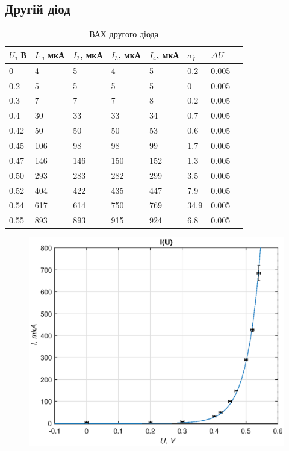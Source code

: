 \documentclass[12pt]{article}
\begin{document}
\subsection{Другій діод}
\begin{table}[ht]
	\centering
	\caption{ВАХ другого діода}
	\begin{tabular}{llllllll}
		\hline
        $U$, В & $I_1$, мкА & $I_2$, мкА & $I_3$, мкА & $I_4$, мкА & $\sigma_{\overline{I}}$ &  $\Delta U$\\
		\hline
		0    & 4   & 5   & 4     & 5   & 0.2  & 0.005\\
        0.2  & 5   & 5   & 5     & 5   & 0    & 0.005\\
        0.3  & 7   & 7   & 7     & 8   & 0.2  & 0.005\\
        0.4  & 30  & 33  & 33    & 34  & 0.7  & 0.005\\
        0.42 & 50  & 50  & 50    & 53  & 0.6  & 0.005\\
        0.45 & 106 & 98  & 98    & 99  & 1.7  & 0.005\\
        0.47 & 146 & 146 & 150   & 152 & 1.3  & 0.005\\
        0.50 & 293 & 283 & 282   & 299 & 3.5  & 0.005\\
        0.52 & 404 & 422 & 435   & 447 & 7.9  & 0.005\\
        0.54 & 617 & 614 & 750   & 769 & 34.9 & 0.005\\
        0.55 & 893 & 893 & 915   & 924 & 6.8  & 0.005\\
		\hline
	\end{tabular}
\end{table}
\begin{figure}[!ht]
    \centering
    \includegraphics[scale=0.7]{vac1.eps}
\end{figure}
\end{document}

